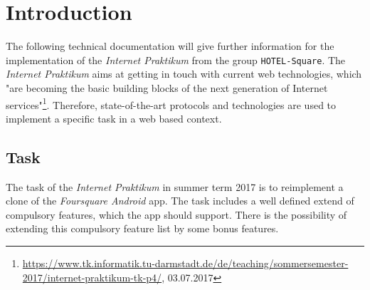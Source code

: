 \section{Introduction}
\label{sec:introduction}
The following technical documentation will give further information for the implementation of the \textit{Internet Praktikum} from the group \texttt{HOTEL-Square}. The \textit{Internet Praktikum} aims at getting in touch with current web technologies, which "are becoming the basic building blocks of the next generation of Internet services"\footnote{\url{https://www.tk.informatik.tu-darmstadt.de/de/teaching/sommersemester-2017/internet-praktikum-tk-p4/}, 03.07.2017}. Therefore, state-of-the-art protocols and technologies are used to implement a specific task in a web based context.

\subsection{Task}
\label{subsec:task}
The task of the \textit{Internet Praktikum} in summer term 2017 is to reimplement a clone of the \textit{Foursquare Android} app. The task includes a well defined extend of compulsory features, which the app should support. There is the possibility of extending this compulsory feature list by some bonus features. 

